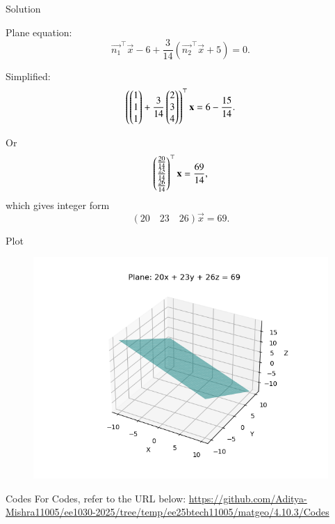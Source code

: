\documentclass{beamer}
\begin{document}
\begin{frame}{Solution}

Plane equation:
\[
\vec{n_1}^\top \vec{x} - 6 + \frac{3}{14} \left(\vec{n_2}^\top \vec{x} + 5 \right) = 0.
\]

Simplified:
\[
\left(\begin{pmatrix}1 \\ 1 \\ 1\end{pmatrix} + \frac{3}{14} \begin{pmatrix}2 \\ 3 \\ 4\end{pmatrix} \right)^\top \mathbf{x} = 6 - \frac{15}{14}.
\]

Or
\[
\begin{pmatrix}\frac{20}{14} \\ \frac{23}{14} \\ \frac{26}{14}\end{pmatrix}^\top \mathbf{x} = \frac{69}{14},
\]
which gives integer form
\[
\boxed{
(20 \quad 23 \quad 26) \vec{x} = 69
}.
\]
\end{frame}
\begin{frame}{Plot}
\begin{figure}
    \centering
    \includegraphics[width=0.8\columnwidth]{Figs/Figure.png}
\end{figure}
\end{frame}

\begin{frame}{Codes}
\centering
For Codes, refer to the URL below:  
\url{https://github.com/Aditya-Mishra11005/ee1030-2025/tree/temp/ee25btech11005/matgeo/4.10.3/Codes}
\end{frame}
\end{document}
